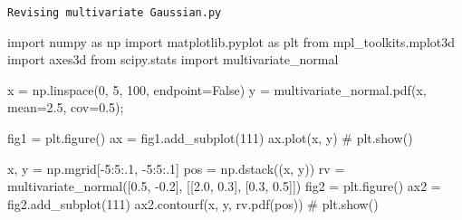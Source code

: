 \documentclass[
  letterpaper,
  DIV=11,
  numbers=noendperiod]{scrreprt}
\newenvironment{Shaded}{\begin{snugshade}}{\end{snugshade}}
\newcommand{\CommentTok}[1]{\textcolor[rgb]{0.37,0.37,0.37}{#1}}
\newcommand{\DecValTok}[1]{\textcolor[rgb]{0.68,0.00,0.00}{#1}}
\newcommand{\FloatTok}[1]{\textcolor[rgb]{0.68,0.00,0.00}{#1}}
\newcommand{\ImportTok}[1]{\textcolor[rgb]{0.00,0.46,0.62}{#1}}
\newcommand{\NormalTok}[1]{\textcolor[rgb]{0.00,0.23,0.31}{#1}}
\newcommand{\OperatorTok}[1]{\textcolor[rgb]{0.37,0.37,0.37}{#1}}
\newcommand{\VariableTok}[1]{\textcolor[rgb]{0.07,0.07,0.07}{#1}}
\theoremstyle{definition}
\theoremstyle{plain}
\theoremstyle{remark}
\begin{document}
\begin{codelisting}

\caption{\texttt{Revising multivariate Gaussian.py}}

\begin{Shaded}
\begin{Highlighting}[]
\ImportTok{import}\NormalTok{ numpy }\ImportTok{as}\NormalTok{ np}
\ImportTok{import}\NormalTok{ matplotlib.pyplot }\ImportTok{as}\NormalTok{ plt}
\ImportTok{from}\NormalTok{ mpl\_toolkits.mplot3d }\ImportTok{import}\NormalTok{ axes3d}
\ImportTok{from}\NormalTok{ scipy.stats }\ImportTok{import}\NormalTok{ multivariate\_normal}

\NormalTok{x }\OperatorTok{=}\NormalTok{ np.linspace(}\DecValTok{0}\NormalTok{, }\DecValTok{5}\NormalTok{, }\DecValTok{100}\NormalTok{, endpoint}\OperatorTok{=}\VariableTok{False}\NormalTok{)}
\NormalTok{y }\OperatorTok{=}\NormalTok{ multivariate\_normal.pdf(x, mean}\OperatorTok{=}\FloatTok{2.5}\NormalTok{, cov}\OperatorTok{=}\FloatTok{0.5}\NormalTok{)}\OperatorTok{;}

\NormalTok{fig1 }\OperatorTok{=}\NormalTok{ plt.figure()}
\NormalTok{ax }\OperatorTok{=}\NormalTok{ fig1.add\_subplot(}\DecValTok{111}\NormalTok{)}
\NormalTok{ax.plot(x, y)}
\CommentTok{\# plt.show()}

\NormalTok{x, y }\OperatorTok{=}\NormalTok{ np.mgrid[}\OperatorTok{{-}}\DecValTok{5}\NormalTok{:}\DecValTok{5}\NormalTok{:}\FloatTok{.1}\NormalTok{, }\OperatorTok{{-}}\DecValTok{5}\NormalTok{:}\DecValTok{5}\NormalTok{:}\FloatTok{.1}\NormalTok{]}
\NormalTok{pos }\OperatorTok{=}\NormalTok{ np.dstack((x, y))}
\NormalTok{rv }\OperatorTok{=}\NormalTok{ multivariate\_normal([}\FloatTok{0.5}\NormalTok{, }\OperatorTok{{-}}\FloatTok{0.2}\NormalTok{], [[}\FloatTok{2.0}\NormalTok{, }\FloatTok{0.3}\NormalTok{], [}\FloatTok{0.3}\NormalTok{, }\FloatTok{0.5}\NormalTok{]])}
\NormalTok{fig2 }\OperatorTok{=}\NormalTok{ plt.figure()}
\NormalTok{ax2 }\OperatorTok{=}\NormalTok{ fig2.add\_subplot(}\DecValTok{111}\NormalTok{)}
\NormalTok{ax2.contourf(x, y, rv.pdf(pos))}
\CommentTok{\# plt.show()}


\end{Highlighting}
\end{Shaded}
\end{codelisting}
\end{document}
